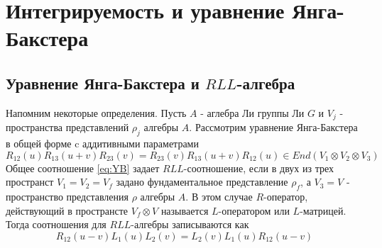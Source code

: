 \documentclass[12pt]{article}
\begin{document}
\section{Интегрируемость и уравнение Янга-Бакстера}
\subsection{Уравнение Янга-Бакстера и $RLL$-алгебра}
Напомним некоторые определения. Пусть $A$ - аглебра Ли группы Ли $G$ и $V_j$ - пространства представлений $\rho_j$ алгебры $A$. 
Рассмотрим уравнение Янга-Бакстера в общей форме c аддитивными параметрами
\begin{equation}\label{eq:YB}
    R_{12}(u)R_{13}(u+v)R_{23}(v) = R_{23}(v)R_{13}(u+v)R_{12}(u) \in End(V_1 \otimes V_2 \otimes V_3)
\end{equation}
Общее соотношение \eqref{eq:YB} задает $RLL$-соотношение, если в двух из трех пространст $V_1 = V_2 = V_f$
задано фундаментальное представление $\rho_f$, а $V_3 = V$ - пространство представления $\rho$ алгебры $A$.
В этом случае $R$-оператор, действующий в пространсте $V_f \otimes V$ называется $L$-оператором или $L$-матрицей. Тогда соотношения для $RLL$-алгебры записываются как 
\begin{equation}\label{eq:RLL}
    R_{12}(u-v)L_1(u)L_2(v) = L_2(v)L_1(u)R_{12}(u-v)
\end{equation}
\end{document}
